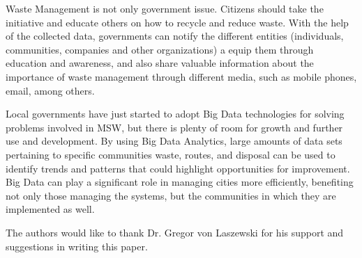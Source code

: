 \documentclass[sigconf]{acmart}
\begin{document}
Waste Management is not only government issue. Citizens should take the initiative and educate others on how to recycle and reduce waste. With the help of the collected data, governments can notify the different entities (individuals, communities, companies and other organizations) a equip them through education and awareness, and also share valuable information about the importance of waste management through different media, such as mobile phones, email, among others.

Local governments have just started to adopt Big Data technologies for solving problems involved in MSW, but there is plenty of room for growth and further use and development.  By using Big Data Analytics, large amounts of data sets pertaining to specific communities waste, routes, and disposal can be used to identify trends and patterns that could highlight opportunities for improvement. Big Data can play a significant role in managing cities more efficiently, benefiting not only those managing the systems, but the communities in which they are implemented as well.

\begin{acks}

The authors would like to thank Dr. Gregor von Laszewski for his support and suggestions in writing this paper.

\end{acks}

 
\end{document}
